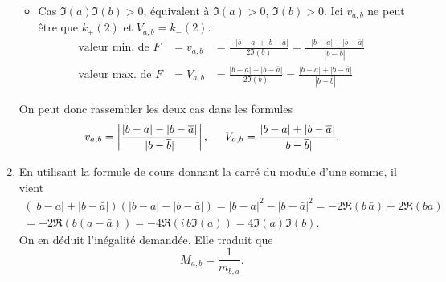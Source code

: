 \begin{enumerate}
\begin{itemize}
  \item Cas $\Im(a)\Im(b)>0$, équivalent à $\Im(a)>0$, $\Im(b)>0$.\newline
Ici $v_{a,b}$ ne peut être que $k_+(2)$ et $V_{a,b} = k_-(2)$.
\begin{align*}
  \text{valeur min. de $F$} &= v_{a,b} &= \frac{-|b-a|+|b-\overline{a}|}{2\Im(b)} = \frac{-|b-a|+|b-\overline{a}|}{|b-\overline{b}|} \\
  \text{valeur max. de $F$} &= V_{a,b} &= \frac{|b-a| + |b-\overline{a}|}{2\Im(b)} = \frac{|b-a|+|b-\overline{a}|}{|b-\overline{b}|} 
\end{align*}
\end{itemize}
On peut donc rassembler les deux cas dans les formules
\begin{displaymath}
v_{a,b} = \left|\frac{|b-a|-|b-\overline{a}|}{|b-\overline{b}|}\right|,
\hspace{0.5cm}
V_{a,b} = \frac{|b-a|+|b-\overline{a}|}{|b-\overline{b}|} .
\end{displaymath}

\item En utilisant la formule de cours donnant la carré du module d'une somme, il vient
\begin{multline*}
  \left(|b-a| + |b- \bar{a}|\right)\left(|b-a| - |b- \bar{a}|\right)
  = |b-a|^2 - |b- \bar{a}|^2
  =-2\Re(b\, \bar{a}) + 2\Re(b a) \\
  = -2\Re\left( b(a-\bar{a})\right)
  = -4\Re\left( i\,b\Im(a)\right)
  = 4 \Im(a) \Im(b).
\end{multline*}
On en déduit l'inégalité demandée. Elle traduit que
\begin{displaymath}
  M_{a,b} = \frac{1}{m_{b,a}} .
\end{displaymath}

\end{enumerate}
